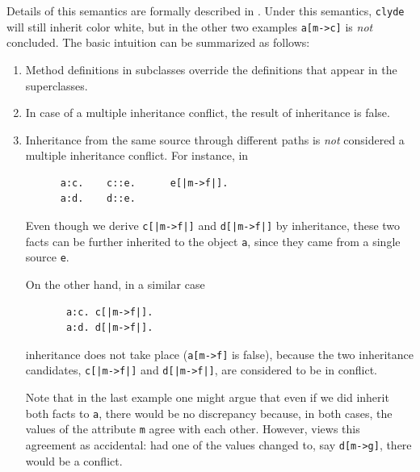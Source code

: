 \documentclass[11pt]{article}
\newcommand{\ERGO}{\mbox{\smaller{\ensuremath{\cal{E}}\smaller{{\sc{RGO}}}}}\xspace}
\newcommand{\FLSYSTEM}{\ERGO}
\begin{document}
Details of this semantics are formally described in
\cite{inheritance-odbase-02}.  Under this semantics, {\tt clyde} will still
inherit color white, but in the other two examples {\tt a[m->c]} is
\emph{not} concluded.  The basic intuition can be summarized as follows:
\begin{enumerate}
\item  Method definitions in subclasses override the definitions that
  appear in the superclasses.
\item In case of a multiple inheritance conflict, the result of inheritance
  is false.
\item  Inheritance from the same source through different paths is
  \emph{not} considered a multiple inheritance conflict. For instance, in
  \begin{verbatim}
      a:c.    c::e.      e[|m->f|].    
      a:d.    d::e.
  \end{verbatim}
  Even though we derive {\tt c[|m->f|]} and {\tt d[|m->f|]} by inheritance,
  these two facts can be further inherited to the object {\tt a}, since
  they came from a single source {\tt e}.

  On the other hand, in a similar case
  \begin{verbatim}
       a:c. c[|m->f|].    
       a:d. d[|m->f|].     
  \end{verbatim}
  inheritance does not take place ({\tt a[m->f]} is false),
  because the two inheritance candidates, {\tt c[|m->f|]} and
  {\tt d[|m->f|]}, are considered to be in conflict.

  Note that in the last example one might argue that even if we did inherit
  both facts to {\tt a}, there would be no discrepancy because, in both
  cases, the values of the attribute {\tt m} agree with each other.
  However, \FLSYSTEM views this agreement as accidental:
  had one of the values changed to, say
  {\tt d[m->g]}, there would be a conflict.
  

\end{enumerate}
\end{document}

